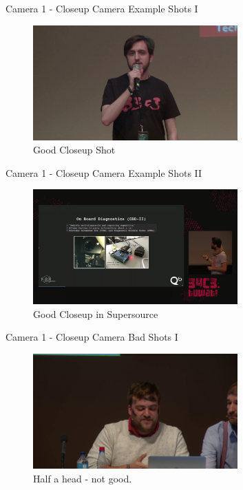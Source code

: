 \documentclass[aspectratio=169]{beamer}
\begin{document}
\begin{frame}{Camera 1 - Closeup Camera}
	Example Shots I
	\begin{figure} 
		\centering
		\includegraphics[width=0.7\textwidth]{images/closeup1.jpg}
		\caption{Good Closeup Shot}
	\end{figure}
\end{frame}

\begin{frame}{Camera 1 - Closeup Camera}
	Example Shots II
	\begin{figure} 
		\centering
		\includegraphics[width=0.7\textwidth]{images/closeup2.jpg}
		\caption{Good Closeup in Supersource}
	\end{figure}
\end{frame}

\begin{frame}{Camera 1 - Closeup Camera}
	Bad Shots I
	\begin{figure} 
		\centering
		\includegraphics[width=0.7\textwidth]{images/closeup-bad1.png}
		\caption{Half a head - not good.}
	\end{figure}
\end{frame}
\end{document}
